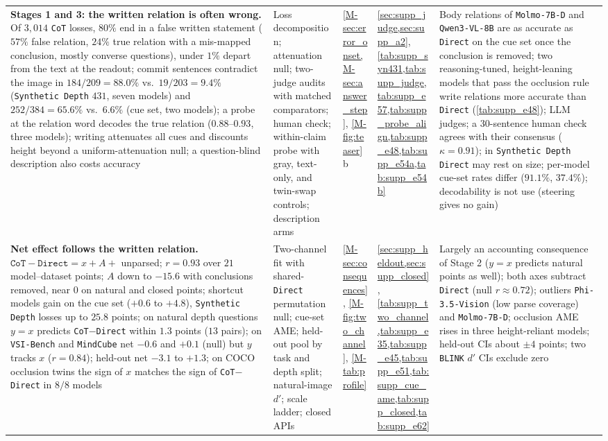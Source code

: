 \begin{tabular}{p{}p{}p{}p{}p{}}
\textbf{Stages 1 and 3: the written relation is often wrong.} Of $3{,}014$ \texttt{CoT} losses, $80\%$ end in a false written statement ($57\%$ false relation, $24\%$ true relation with a mis-mapped conclusion, mostly converse questions), under $1\%$ depart from the text at the readout; commit sentences contradict the image in $184/209 = 88.0\%$ vs.\ $19/203 = 9.4\%$ (\texttt{Synthetic Depth} $431$, seven models) and $252/384 = 65.6\%$ vs.\ $6.6\%$ (cue set, two models); a probe at the relation word decodes the true relation ($0.88$--$0.93$, three models); writing attenuates all cues and discounts height beyond a uniform-attenuation null; a question-blind description also costs accuracy & Loss decomposition; attenuation null; two-judge audits with matched comparators; human check; within-claim probe with gray, text-only, and twin-swap controls; description arms & \cref{M-sec:error_onset,M-sec:answer_step}, \cref{M-fig:teaser}b & \cref{sec:supp_judge,sec:supp_a2}, \cref{tab:supp_syn431,tab:supp_judge,tab:supp_e57,tab:supp_probe_align,tab:supp_e48,tab:supp_e54a,tab:supp_e54b} & Body relations of \texttt{Molmo-7B-D} and \texttt{Qwen3-VL-8B} are as accurate as \texttt{Direct} on the cue set once the conclusion is removed; two reasoning-tuned, height-leaning models that pass the occlusion rule write relations more accurate than \texttt{Direct} (\cref{tab:supp_e48}); LLM judges; a $30$-sentence human check agrees with their consensus ($\kappa = 0.91$); in \texttt{Synthetic Depth} \texttt{Direct} may rest on size; per-model cue-set rates differ ($91.1\%$, $37.4\%$); decodability is not use (steering gives no gain) \\
\textbf{Net effect follows the written relation.} $\texttt{CoT}-\texttt{Direct}=x+A+$ unparsed; $r=0.93$ over $21$ model--dataset points; $A$ down to $-15.6$ with conclusions removed, near $0$ on natural and closed points; shortcut models gain on the cue set ($+0.6$ to $+4.8$), \texttt{Synthetic Depth} losses up to $25.8$ points; on natural depth questions $y=x$ predicts \texttt{CoT}$-$\texttt{Direct} within $1.3$ points ($13$ pairs); on \texttt{VSI-Bench} and \texttt{MindCube} net $-0.6$ and $+0.1$ (null) but $y$ tracks $x$ ($r=0.84$); held-out net $-3.1$ to $+1.3$; on COCO occlusion twins the sign of $x$ matches the sign of \texttt{CoT}$-$\texttt{Direct} in $8/8$ models & Two-channel fit with shared-\texttt{Direct} permutation null; cue-set AME; held-out pool by task and depth split; natural-image $d'$; scale ladder; closed APIs & \cref{M-sec:consequences}, \cref{M-fig:two_channel}, \cref{M-tab:profile} & \cref{sec:supp_heldout,sec:supp_closed}, \cref{tab:supp_two_channel,tab:supp_e35,tab:supp_e45,tab:supp_e51,tab:supp_cue_ame,tab:supp_closed,tab:supp_e62} & Largely an accounting consequence of Stage 2 ($y=x$ predicts natural points as well); both axes subtract \texttt{Direct} (null $r\approx0.72$); outliers \texttt{Phi-3.5-Vision} (low parse coverage) and \texttt{Molmo-7B-D}; occlusion AME rises in three height-reliant models; held-out CIs about $\pm4$ points; two \texttt{BLINK} $d'$ CIs exclude zero \\

\end{tabular}
